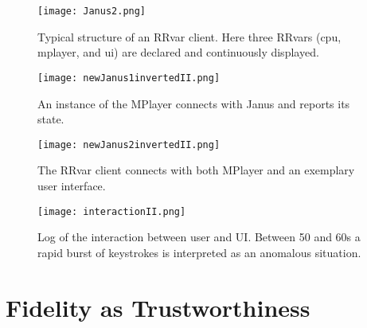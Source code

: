 \documentclass{article}
\begin{document}
\begin{figure}
\centerline{\texttt{[image: Janus2.png]}}
\caption{Typical structure of an RRvar client. Here three RRvars (cpu, mplayer, and ui) are declared and continuously
displayed.}
\label{f:Janus1}
\end{figure}

\begin{figure}
\centerline{\texttt{[image: newJanus1invertedII.png]}}
\caption{An instance of the MPlayer connects with Janus and reports its state.}
\label{f:newJanus1}
\end{figure}

\begin{figure}
\centerline{\texttt{[image: newJanus2invertedII.png]}}
\caption{The RRvar client connects with both MPlayer and an exemplary user interface.}
\label{f:newJanus2}
\end{figure}

\begin{figure}
\centerline{\texttt{[image: interactionII.png]}}
\caption{Log of the interaction between user and UI. Between 50 and 60s a rapid burst of keystrokes
is interpreted as an anomalous situation.}
\label{f:interaction}
\end{figure}



\section{Fidelity as Trustworthiness}\label{s:trust}
\end{document}
